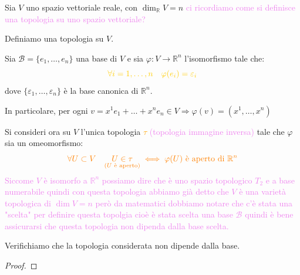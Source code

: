         \newpage
        \begin{esempio}
        \mbox{}
        
        Sia $V$ uno spazio vettoriale reale, con $\dim_{\mathbb{R}} V = n$ \textcolor{violet}{ci ricordiamo come si definisce una topologia su uno spazio vettoriale?} 
        
        Definiamo una topologia su $V$.

        Sia $\mathcal{B} = \{e_1, \dots, e_n\}$ una base di $V$ e sia \textcolor{amber}{$\varphi \colon V \to \mathbb{R}^n$} l'isomorfismo tale che:
        \[
        \color{amber} \forall i = 1, \dots, n \quad \varphi(e_i) = \varepsilon_i
        \]
        dove $\{\varepsilon_1, \dots, \varepsilon_n\}$ è la base canonica di $\mathbb{R}^n$.
         
        \textcolor{blu}{In particolare, per ogni $v = x^1 e_1 + \dots + x^n e_n \in V \Rightarrow \varphi(v) = (x^1, \dots, x^n)$}

        Si consideri ora su $V$ l'unica topologia \textcolor{orange}{$\tau$} \textcolor{violet}{(topologia immagine inversa)} tale che $\varphi$ sia un omeomorfismo:
        \[
        \color{orange} \forall U \subset V \quad \underset{(U \text{ è aperto})}{U \in \tau} \iff \varphi(U) \text{ è aperto di } \mathbb{R}^n
        \]
        \textcolor{violet}{Siccome $V$ è isomorfo a $\mathbb{R}^n$ possiamo dire che è uno spazio topologico $T_2$ e a base numerabile quindi
        con questa topologia abbiamo già detto che $V$ è una varietà topologica di $\dim V =n$ però da matematici dobbiamo notare che c'è stata una "scelta" per definire
        questa topolgia cioè è stata scelta una base $\mathcal{B}$ quindi è bene assicurarsi che questa topologia non dipenda dalla base scelta.}

        Verifichiamo che la topologia considerata non dipende dalla base.
        \begin{proof}
        \mbox{}


\end{proof}
\end{esempio}
